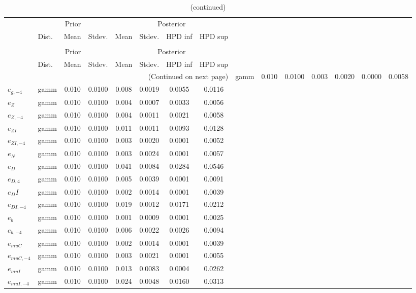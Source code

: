  
\begin{center}
\begin{longtable}{llcccccc} 
\caption{Results from Metropolis-Hastings (standard deviation of structural shocks)}
 \label{Table:MHPosterior:2}\\
\toprule 
  & \multicolumn{3}{c}{Prior}  &  \multicolumn{4}{c}{Posterior} \\
  \cmidrule(r{.75em}){2-4} \cmidrule(r{.75em}){5-8}
  & Dist. & Mean  & Stdev. & Mean & Stdev. & HPD inf & HPD sup\\
\midrule \endfirsthead 
\caption{(continued)}\\\toprule 
  & \multicolumn{3}{c}{Prior}  &  \multicolumn{4}{c}{Posterior} \\
  \cmidrule(r{.75em}){2-4} \cmidrule(r{.75em}){5-8}
  & Dist. & Mean  & Stdev. & Mean & Stdev. & HPD inf & HPD sup\\
\midrule \endhead 
\bottomrule \multicolumn{8}{r}{(Continued on next page)} \endfoot 
\bottomrule \endlastfoot 
${e_g}$ & gamm &   0.010 & 0.0100 &   0.003& 0.0020 &  0.0000 &  0.0058 \\ 
${e_{g,-4}}$ & gamm &   0.010 & 0.0100 &   0.008& 0.0019 &  0.0055 &  0.0116 \\ 
${e_Z}$ & gamm &   0.010 & 0.0100 &   0.004& 0.0007 &  0.0033 &  0.0056 \\ 
${e_{Z,-4}}$ & gamm &   0.010 & 0.0100 &   0.004& 0.0011 &  0.0021 &  0.0058 \\ 
${e_{ZI}}$ & gamm &   0.010 & 0.0100 &   0.011& 0.0011 &  0.0093 &  0.0128 \\ 
${e_{ZI,-4}}$ & gamm &   0.010 & 0.0100 &   0.003& 0.0020 &  0.0001 &  0.0052 \\ 
${e_N}$ & gamm &   0.010 & 0.0100 &   0.003& 0.0024 &  0.0001 &  0.0057 \\ 
${e_D}$ & gamm &   0.010 & 0.0100 &   0.041& 0.0084 &  0.0284 &  0.0546 \\ 
${e_{D,4}}$ & gamm &   0.010 & 0.0100 &   0.005& 0.0039 &  0.0001 &  0.0091 \\ 
${e_DI}$ & gamm &   0.010 & 0.0100 &   0.002& 0.0014 &  0.0001 &  0.0039 \\ 
${e_{DI,-4}}$ & gamm &   0.010 & 0.0100 &   0.019& 0.0012 &  0.0171 &  0.0212 \\ 
${e_b}$ & gamm &   0.010 & 0.0100 &   0.001& 0.0009 &  0.0001 &  0.0025 \\ 
${e_{b,-4}}$ & gamm &   0.010 & 0.0100 &   0.006& 0.0022 &  0.0026 &  0.0094 \\ 
${e_{muC}}$ & gamm &   0.010 & 0.0100 &   0.002& 0.0014 &  0.0001 &  0.0039 \\ 
${e_{muC,-4}}$ & gamm &   0.010 & 0.0100 &   0.003& 0.0021 &  0.0001 &  0.0055 \\ 
${e_{muI}}$ & gamm &   0.010 & 0.0100 &   0.013& 0.0083 &  0.0004 &  0.0262 \\ 
${e_{muI,-4}}$ & gamm &   0.010 & 0.0100 &   0.024& 0.0048 &  0.0160 &  0.0313 \\ 
\end{longtable}
 \end{center}
